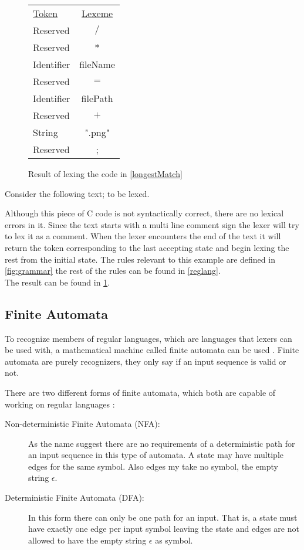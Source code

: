 \begin{figure}[hb!]
\begin{center}
\begin{tabular}{l c}
\underline{Token} & \underline{Lexeme}\\
Reserved & $/$\\
Reserved & $*$\\
Identifier &fileName\\
Reserved & $=$\\
Identifier & filePath\\
Reserved & $+$\\
String & ".png"\\
Reserved & ;
\end{tabular}
\end{center}
\caption{Result of lexing the code in \cref{longestMatch} \label{fig:longestmatch}}
\end{figure}
\newpage
\begin{example} \label{longestMatch}
Consider the following text; to be lexed.

Although this piece of C code is not syntactically correct, there are no
lexical errors in it. Since
the text starts with a multi line comment sign the lexer will try to lex it as
a comment. When the lexer encounters the end of the text it will return the
token corresponding to the last accepting state and begin lexing the rest from
the initial state. The rules relevant to this example are defined in 
\cref{fig:grammar} the rest of the rules can be found in \cref{reglang}.\\
The result can be found in \cref{fig:longestmatch}.
\end{example}

\subsection{Finite Automata}
To recognize members of regular languages, which are languages that lexers can
be used with, a mathematical machine called finite automata can be used
\cite{sebesta2012}. Finite automata are purely recognizers, they only say if an
input sequence is valid or not.

There are two different forms of finite automata, which both are capable of
working on regular languages \cite{Aho2006}:
\begin{description}
\item [Non-deterministic Finite Automata (NFA):] As the name suggest there are no
requirements of a deterministic path for an input sequence in this type of
automata. A state may have multiple edges for the same symbol. Also edges my
take no symbol, the empty string $\epsilon$.
\item [Deterministic Finite Automata (DFA):] In this form there can only be one
path for an input. That is, a state must have exactly one edge per input symbol
leaving the state and edges are not allowed to have the empty string $\epsilon$
as symbol.
\end{description}

